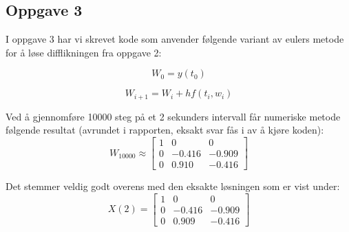 \subsection{Oppgave 3}

I oppgave 3 har vi skrevet kode som anvender følgende variant av eulers metode for å løse difflikningen fra oppgave 2:

\begin{equation}
    W_0 = y(t_0)
\end{equation}

\begin{equation}
    W_{i+1} = W_i + hf(t_i, w_i)
\end{equation}

Ved å gjennomføre 10000 steg på et 2 sekunders intervall får numeriske metode følgende resultat (avrundet i rapporten, eksakt svar fås i av å kjøre koden):\newline
\begin{equation}
W_{10000} \approx    
\begin{bmatrix}
1 & 0 & 0 \\
0 & -0.416 & -0.909 \\
0 & 0.910 & -0.416
\end{bmatrix}
\end{equation}

Det stemmer veldig godt overens med den eksakte løsningen som er vist under:\newline
\begin{equation}
X(2) =     
\begin{bmatrix}
1 & 0 & 0 \\
0 & -0.416 & -0.909 \\
0 & 0.909 & -0.416
\end{bmatrix}
\end{equation}
